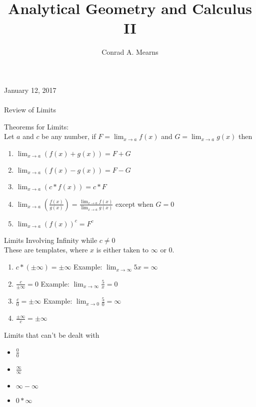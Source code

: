 \documentclass{article}
\title{Analytical Geometry and Calculus II}
\author{Conrad A. Mearns}
\begin{document}
\maketitle

\noindent
\Large
January 12, 2017\\\\
Review of Limits\\
\normalsize

\noindent
Theorems for Limits:\\
Let $a$ and $c$ be any number, if $F = \lim_{x \to a}f(x)$ and $G = \lim_{x \to a}g(x)$ then

\begin{enumerate}
  \item $\lim_{x \to a}(f(x) + g(x)) = F + G$
  \item $\lim_{x \to a}(f(x) - g(x)) = F - G$
  \item $\lim_{x \to a}(c * f(x)) = c * F$
  \item $\lim_{x \to a}(\frac{f(x)}{g(x)}) = \frac{\lim_{x \to a}f(x)}{\lim_{x \to a}g(x)}$ except when $G = 0$
  \item $\lim_{x \to a}(f(x))^c = F^c$
\end{enumerate}

\noindent
\Large
Limits Involving Infinity while $c \neq 0$\\
\normalsize
\noindent
These are templates, where $x$ is either taken to $\infty$ or 0.

\begin{enumerate}
  \item $c * (\pm \infty) = \pm \infty$ Example: $\lim_{x \to \infty}5x = \infty$
  \item $\frac{c}{\pm \infty} = 0$ Example: $\lim_{x \to \infty}\frac{5}{x} = 0$
  \item $\frac{c}{0} = \pm \infty$ Example: $\lim_{x \to 0}\frac{5}{0} = \infty$
  \item $\frac{\pm \infty}{c} = \pm \infty$
\end{enumerate}

\noindent
\Large
Limits that can't be dealt with
\normalsize
\noindent
\begin{itemize}
  \item $\frac{0}{0}$
  \item $\frac{\infty}{\infty}$
  \item $\infty - \infty$
  \item $0 * \infty$
\end{itemize}
\end{document}
